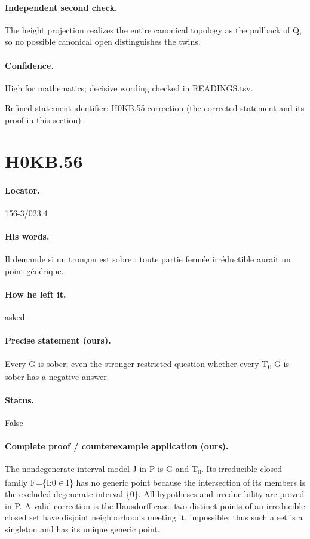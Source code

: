 \paragraph{Independent second check.} The height projection realizes the entire canonical topology as the pullback of Q, so no possible canonical open distinguishes the twins.

\paragraph{Confidence.} High for mathematics; decisive wording checked in READINGS.tsv.

\noindent Refined statement identifier: H0KB.55.correction (the corrected statement and its proof in this section).

\section*{H0KB.56}\label{statement:H0KB.56}
\paragraph{Locator.} 156-3/023.4

\paragraph{His words.} Il demande si un tronçon est sobre : toute partie fermée irréductible aurait un point générique.

\paragraph{How he left it.} asked

\paragraph{Precise statement (ours).} Every G is sober; even the stronger restricted question whether every T\textsubscript{0} G is sober has a negative answer.

\paragraph{Status.} False

\paragraph{Complete proof / counterexample application (ours).} The nondegenerate-interval model J in P is G and T\textsubscript{0}. Its irreducible closed family F=\{I:0\ensuremath{\in}I\} has no generic point because the intersection of its members is the excluded degenerate interval \{0\}. All hypotheses and irreducibility are proved in P. A valid correction is the Hausdorff case: two distinct points of an irreducible closed set have disjoint neighborhoods meeting it, impossible; thus such a set is a singleton and has its unique generic point.

